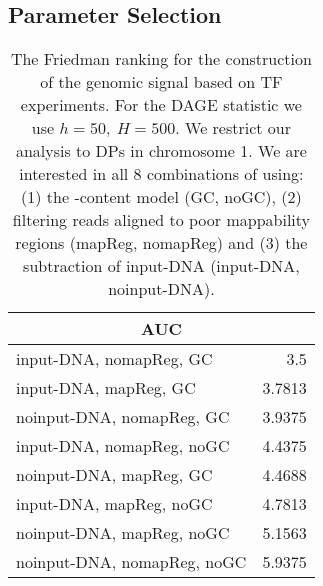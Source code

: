 \subsection{Parameter Selection}
\begin{table}[H]
\label{tab:ranking}
\begin{center}
\renewcommand{\arraystretch}{1.2}
  \begin{tabular}{ |lr| }
    \hline
    \multicolumn{2}{|c|}{\textbf{AUC}} \\
    \hline
    input-DNA, nomapReg, GC & 3.5 \\
    input-DNA, mapReg, GC & 3.7813 \\
    noinput-DNA, nomapReg, GC & 3.9375 \\
    input-DNA, nomapReg, noGC & 4.4375 \\
    noinput-DNA, mapReg, GC & 4.4688 \\
    input-DNA, mapReg, noGC & 4.7813 \\
    noinput-DNA, mapReg, noGC & 5.1563 \\
    noinput-DNA, nomapReg, noGC & 5.9375 \\
    \hline
  \end{tabular}
\end{center}
\caption[Friedman ranking of ODIN's parametrization for TF experiments]{The Friedman ranking for the construction of the genomic signal based on TF experiments. 
For the DAGE statistic we use $h=50,\ H=500$. 
We restrict our analysis to DPs in chromosome 1.
We are interested in all 8 combinations of using: (1) the -content model (GC, noGC), (2) filtering reads aligned to poor mappability regions (mapReg, nomapReg) and (3) the subtraction of input-DNA (input-DNA, noinput-DNA).}
\label{tab_preprocess_tf}
\end{table}

